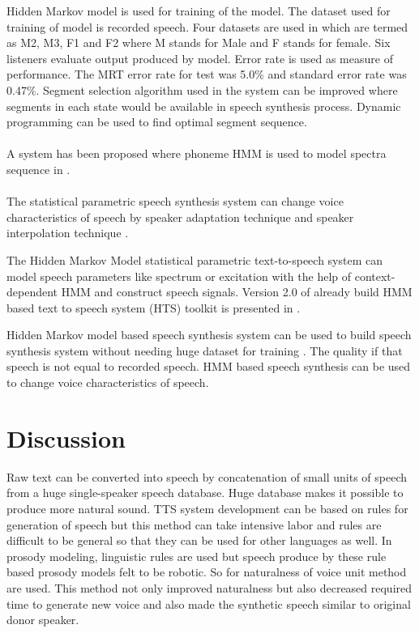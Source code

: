 Hidden Markov model is used for training of the model. The dataset used for training of model is recorded speech. Four datasets are used in which are termed as M2, M3, F1 and F2 where M stands for Male and F stands for female. Six listeners evaluate output produced by model. Error rate is used as measure of performance. 
The MRT error rate for test was 5.0\% and standard error rate was 0.47\%. Segment selection algorithm used in the system can be improved where segments in each state would be available in speech synthesis process. Dynamic programming can be used to find optimal segment sequence.
\\ \\
A system has been proposed where phoneme HMM is used to model spectra sequence in \cite{masuko1996speech}.
\\ \\
The statistical parametric speech synthesis system can change voice characteristics of speech by speaker adaptation technique \cite{tamura1998speaker} and speaker interpolation technique \cite{yoshimura2001speaker}.

The Hidden Markov Model statistical parametric text-to-speech system can model speech parameters like spectrum or excitation with the help of context-dependent HMM and construct speech signals. Version 2.0 of already build HMM based text to speech system (HTS) toolkit is presented in \cite{zen2007hmm}.

Hidden Markov model based speech synthesis system can be used to build speech synthesis system without needing huge dataset for training \cite{huang2001spoken}. The quality if that speech is not equal to recorded speech. HMM based speech synthesis can be used to change voice
characteristics of speech. 


\section{Discussion}
Raw text can be converted into speech by concatenation of small units of speech from a huge single-speaker speech database.
Huge database makes it possible to produce more natural sound. TTS system development can be based on rules for
generation of speech but this method can take intensive labor and rules are
difficult to be general so that they can be used for other languages as well. In prosody modeling, linguistic rules are used
\cite{klatt1987review} \cite{pierrehumbert1981synthesizing} but speech produce by these rule based prosody models felt to be robotic. So
for naturalness of voice unit method are used. This method not only improved naturalness but also decreased required time to
generate new voice and also made the synthetic speech similar to original donor speaker.

